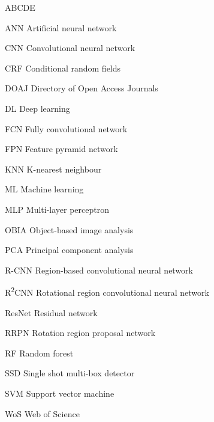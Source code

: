 
\begin{seznamzkratek}{ABCDE}

	      {ANN}
	      {Artificial neural network}

	      {CNN}
	      {Convolutional neural network}

	      {CRF}
	      {Conditional random fields}

	      {DOAJ}
	      {Directory of Open Access Journals}

	      {DL}
	      {Deep learning}

	      {FCN}
	      {Fully convolutional network}

	      {FPN}
	      {Feature pyramid network}

	      {KNN}
	      {K-nearest neighbour}

	      {ML}
	      {Machine learning}

	      {MLP}
	      {Multi-layer perceptron}

	      {OBIA}
	      {Object-based image analysis}

	      {PCA}
	      {Principal component analysis}

	      {R-CNN}
	      {Region-based convolutional neural network}

	      {R\textsuperscript{2}CNN}
	      {Rotational region convolutional neural network}

	      {ResNet}
	      {Residual network}

	      {RRPN}
	      {Rotation region proposal network}

	      {RF}
	      {Random forest}

	      {SSD}
	      {Single shot multi-box detector}

	      {SVM}
	      {Support vector machine}

	      {WoS}
	      {Web of Science}
	      
\end{seznamzkratek}